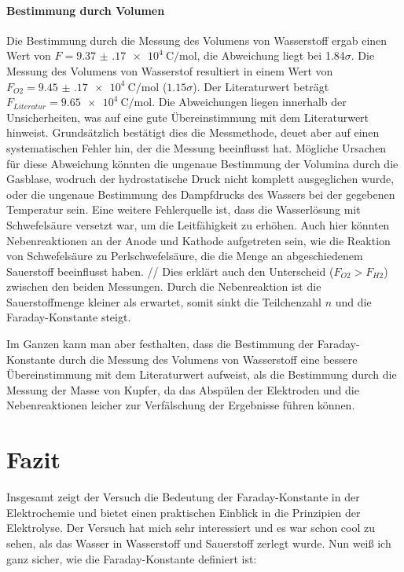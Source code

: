\documentclass[12pt,a4paper,titlepage]{scrartcl}
\numberwithin{equation}{section}
\numberwithin{table}{section}
\numberwithin{figure}{section}
\begin{document}
\paragraph{Bestimmung durch Volumen}
Die Bestimmung durch die Messung des Volumens von Wasserstoff ergab einen Wert von $F = \qty{9.37(17)e4}{\coulomb\per\mol}$, die Abweichung liegt bei 1.84$\sigma$. Die Messung des Volumens von Wasserstof resultiert in einem Wert von $F_{O2} = \qty{9.45(17)e4}{\coulomb\per\mol}$ ($1.15\sigma$). Der Literaturwert beträgt $F_{Literatur} = \qty{9.65e4}{\coulomb\per\mol}$. Die Abweichungen liegen innerhalb der Unsicherheiten, was auf eine gute Übereinstimmung mit dem Literaturwert hinweist.
Grundsätzlich bestätigt dies die Messmethode, deuet aber auf einen systematischen Fehler hin, der die Messung beeinflusst hat. Mögliche Ursachen für diese Abweichung könnten die ungenaue Bestimmung der Volumina durch die Gasblase, wodruch der hydrostatische Druck nicht komplett ausgeglichen wurde, oder die ungenaue Bestimmung des Dampfdrucks des Wassers bei der gegebenen Temperatur sein. Eine weitere Fehlerquelle ist, dass die Wasserlösung mit Schwefelsäure versetzt war, um die Leitfähigkeit zu erhöhen. Auch hier könnten Nebenreaktionen an der Anode und Kathode aufgetreten sein, wie die Reaktion von Schwefelsäure zu Perlschwefelsäure, die die Menge an abgeschiedenem Sauerstoff beeinflusst haben. //
Dies erklärt auch den Unterscheid ($F_{O2} > F_{H2}$) zwischen den beiden Messungen. Durch die Nebenreaktion ist die Sauerstoffmenge kleiner als erwartet, somit sinkt die Teilchenzahl $n$ und die Faraday-Konstante steigt. 

Im Ganzen kann man aber festhalten, dass die Bestimmung der Faraday-Konstante durch die Messung des Volumens von Wasserstoff eine bessere Übereinstimmung mit dem Literaturwert aufweist, als die Bestimmung durch die Messung der Masse von Kupfer, da das Abspülen der Elektroden und die Nebenreaktionen leicher zur Verfälschung der Ergebnisse führen können. 

 \section{Fazit}
Insgesamt zeigt der Versuch die Bedeutung der Faraday-Konstante in der Elektrochemie und bietet einen praktischen Einblick in die Prinzipien der Elektrolyse. Der Versuch hat mich sehr interessiert und es war schon cool zu sehen, als das Wasser in Wasserstoff und Sauerstoff zerlegt wurde. Nun weiß ich ganz sicher, wie die Faraday-Konstante definiert ist:
\end{document}
